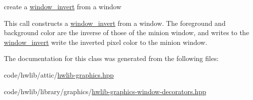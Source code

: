 create a \hyperlink{classhwlib_1_1window__invert}{window\+\_\+invert} from a window

This call constructs a \hyperlink{classhwlib_1_1window__invert}{window\+\_\+invert} from a window. The foreground and background color are the inverse of those of the minion window, and writes to the \hyperlink{classhwlib_1_1window__invert}{window\+\_\+invert} write the inverted pixel color to the minion window. 

The documentation for this class was generated from the following files\+:\begin{DoxyCompactItemize}
\item 
code/hwlib/attic/\hyperlink{hwlib-graphics_8hpp}{hwlib-\/graphics.\+hpp}\item 
code/hwlib/library/graphics/\hyperlink{hwlib-graphics-window-decorators_8hpp}{hwlib-\/graphics-\/window-\/decorators.\+hpp}\end{DoxyCompactItemize}
